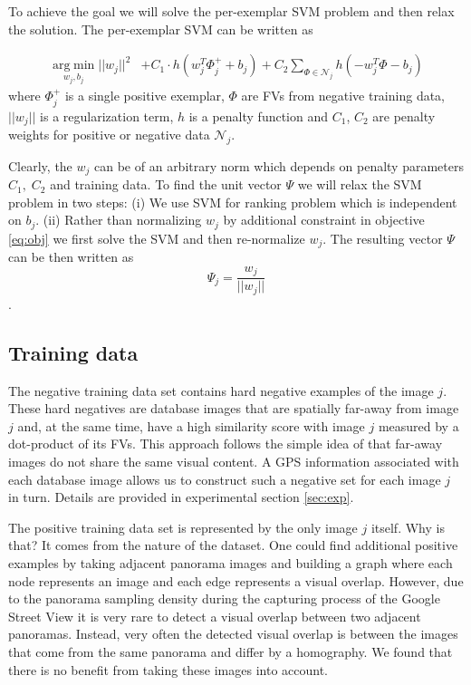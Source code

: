 \documentclass[table]{article} %
\begin{document}
	To achieve the goal we will solve the per-exemplar SVM problem and then relax the solution. The per-exemplar SVM can be written as

	\begin{align}
        \operatorname*{arg\;min}_{w_j, b_j}
        ||w_j||^{2}& +C_1 \cdot h(w_j^T\Phi^+_j+b_j)
                         +C_2\sum_{\Phi\in \mathcal N_j}h(-w_j^T\Phi-b_j) 	
       	\label{eq:obj} 
  	\end{align}
  	where $\Phi^+_j$ is a single positive exemplar, $\Phi$ are FVs from negative training data, $||w_j||$ is a regularization term, $h$ is a penalty function and $C_1$, $C_2$ are penalty weights for positive or negative data $\mathcal N_j$. 

  	Clearly, the $w_j$ can be of an arbitrary norm  which depends on penalty parameters $C_1,\;C_2$ and training data. To find the unit vector $\Psi$ we will relax the SVM problem in two steps: (i) We use SVM for ranking problem which is independent on $b_j$. (ii) Rather than normalizing $w_j$ by additional constraint in objective \eqref{eq:obj} we first solve the SVM and then re-normalize $w_j$. The resulting vector $\Psi$ can be then written as
	  	\begin{equation}
	  		\Psi_j=\dfrac{w_j}{||w_j||}
	  	\end{equation}.



    \subsection{Training data}
      	The negative training data set contains hard negative examples of the image $j$. These hard negatives are database images that are spatially far-away from image $j$ and, at the same time, have a high similarity score with image $j$ measured by a dot-product of its FVs. This approach follows the simple idea of \cite{Knopp2010} that far-away images do not share the same visual content. A GPS information associated with each database image allows us to construct such a negative set for each image $j$ in turn. Details are provided in experimental section \ref{sec:exp}.

      	The positive training data set is represented by the only image $j$ itself. Why is that? It comes from the nature of the dataset. One could find additional positive examples by taking adjacent panorama images and building a graph where each node represents an image and each edge represents a visual overlap. However, due to the panorama sampling density during the capturing process of the Google Street View it is very rare to detect a visual overlap between two adjacent panoramas. Instead, very often the detected visual overlap is between the images that come from the same panorama and differ by a homography. We found that there is no benefit from taking these images into account.
\end{document}
